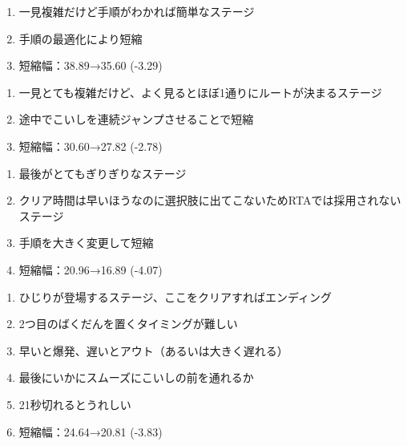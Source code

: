 \begin{enumerate}[label={\sarrow}]
\item 一見複雑だけど手順がわかれば簡単なステージ
\item 手順の最適化により短縮
\item 短縮幅：38.89→35.60 (-3.29)
\end{enumerate}



\begin{enumerate}[label={\sarrow}]
\item 一見とても複雑だけど、よく見るとほぼ1通りにルートが決まるステージ
\item 途中でこいしを連続ジャンプさせることで短縮
\item 短縮幅：30.60→27.82 (-2.78)
\end{enumerate}



\begin{enumerate}[label={\sarrow}]
\item 最後がとてもぎりぎりなステージ
\item クリア時間は早いほうなのに選択肢に出てこないためRTAでは採用されないステージ
\item 手順を大きく変更して短縮
\item 短縮幅：20.96→16.89 (-4.07)
\end{enumerate}



\begin{enumerate}[label={\sarrow}]
\item ひじりが登場するステージ、ここをクリアすればエンディング
\item 2つ目のばくだんを置くタイミングが難しい
\item 早いと爆発、遅いとアウト（あるいは大きく遅れる）
\item 最後にいかにスムーズにこいしの前を通れるか
\item 21秒切れるとうれしい
\item 短縮幅：24.64→20.81 (-3.83)
\end{enumerate}




\begin{appendices}
\end{appendices}

